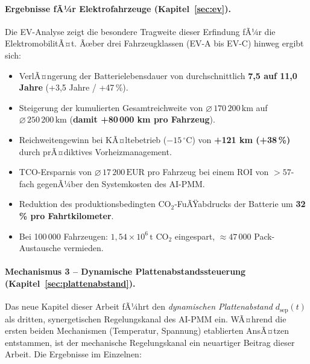 ﻿\documentclass[12pt,a4paper]{article}
\begin{document}
	\paragraph{Ergebnisse fÃ¼r Elektrofahrzeuge (Kapitel~\ref{sec:ev}).}
	Die EV-Analyse zeigt die besondere Tragweite dieser Erfindung fÃ¼r die
	ElektromobilitÃ¤t. Ãœber drei Fahrzeugklassen (EV-A bis EV-C) hinweg ergibt sich:
	
	\begin{itemize}[leftmargin=*]
		\item VerlÃ¤ngerung der Batterielebensdauer von durchschnittlich
		\textbf{7{,}5 auf 11{,}0 Jahre} (+3{,}5 Jahre / +47\,\%).
		\item Steigerung der kumulierten Gesamtreichweite von
		$\varnothing\,170\,200\,\mathrm{km}$ auf $\varnothing\,250\,200\,\mathrm{km}$
		(\textbf{damit +80\,000 km pro Fahrzeug}).
		\item Reichweitengewinn bei KÃ¤ltebetrieb ($-15\,^\circ\mathrm{C}$) von
		\textbf{+121 km (+38\,\%)} durch prÃ¤diktives Vorheizmanagement.
		\item TCO-Ersparnis von $\varnothing\,17\,200\,\text{EUR}$ pro Fahrzeug
		bei einem ROI von $> 57$-fach gegenÃ¼ber den Systemkosten des AI-PMM.
		\item Reduktion des produktionsbedingten CO$_2$-FuÃŸabdrucks der Batterie
		um \textbf{32\,\% pro Fahrtkilometer}.
		\item Bei 100\,000 Fahrzeugen: $1{,}54 \times 10^6\,\mathrm{t}$ CO$_2$
		eingespart, $\approx 47\,000$ Pack-Austausche vermieden.
	\end{itemize}
	
	\paragraph{Mechanismus 3 -- Dynamische Plattenabstandssteuerung
		(Kapitel~\ref{sec:plattenabstand}).}
	Das neue Kapitel dieser Arbeit fÃ¼hrt den \textit{dynamischen Plattenabstand}
	$d_\mathrm{sep}(t)$ als dritten, synergetischen Regelungskanal des AI-PMM ein.
	WÃ¤hrend die ersten beiden Mechanismen (Temperatur, Spannung) etablierten
	AnsÃ¤tzen entstammen, ist der mechanische Regelungskanal ein neuartiger Beitrag
	dieser Arbeit. Die Ergebnisse im Einzelnen:
	
\end{document}

